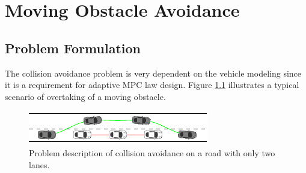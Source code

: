 \chapter{Moving Obstacle Avoidance}

\section{Problem Formulation}
The collision avoidance problem is very dependent on the vehicle modeling since it is a requirement for  adaptive MPC law design. Figure \ref{fig:obstacleAvoidance} illustrates a typical scenario of overtaking of a moving obstacle.
\begin{figure}[!h]
	\centering
	\includegraphics[width=\textwidth]{../figure/obstacleAvoidance/obstacleAvoidance.pdf}
	\caption{Problem description of collision avoidance on a road with only two lanes.}
	\label{fig:obstacleAvoidance}
\end{figure}

